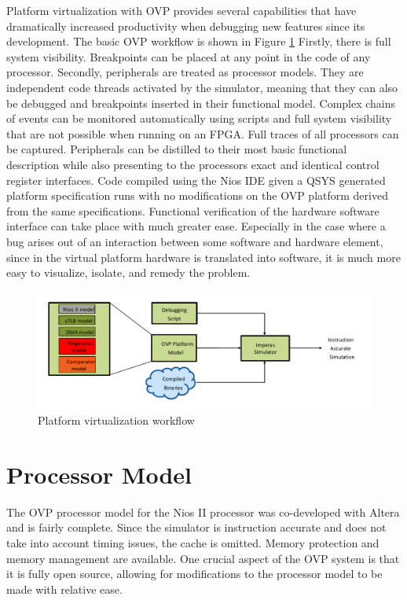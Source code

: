 Platform virtualization with OVP provides several capabilities that have dramatically increased productivity when debugging new features since its development. The basic OVP workflow is shown in Figure \ref{f:ovp} Firstly, there is full system visibility. Breakpoints can be placed at any point in the code of any processor. Secondly, peripherals are treated as processor models. They are independent code threads activated by the simulator, meaning that they can also be debugged and breakpoints inserted in their functional model. Complex chains of events can be monitored automatically using scripts and full system visibility that are not possible when running on an FPGA. Full traces of all processors can be captured. Peripherals can be distilled to their most basic functional description while also presenting to the processors exact and identical control register interfaces. Code compiled using the Nios IDE given a QSYS generated platform specification runs with no modifications on the OVP platform derived from the same specifications. Functional verification of the hardware software interface can take place with much greater ease. Especially in the case where a bug arises out of an interaction between some software and hardware element, since in the virtual platform hardware is translated into software, it is much more easy to visualize, isolate, and remedy the problem.

\begin{figure}[h]
\centering
\includegraphics[scale=0.8]{Figures/ovp}
\caption{Platform virtualization workflow}
\label{f:ovp}
\end{figure}

\section{Processor Model}

The OVP processor model for the Nios II processor was co-developed with Altera and is fairly complete. Since the simulator is instruction accurate and does not take into account timing issues, the cache is omitted. Memory protection and memory management are available. One crucial aspect of the OVP system is that it is fully open source, allowing for modifications to the processor model to be made with relative ease. 


